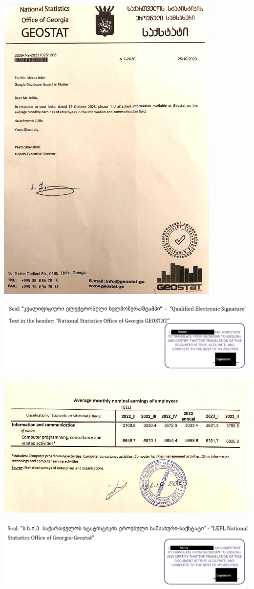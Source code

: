 
\begin{center}
    \includegraphics[width=30em]{salary-cover}
\end{center}
\WillContinue
\pagebreak

\Continuing
\includegraphics[width=\textwidth]{salary-cover_tr_public}

\includegraphics[width=\textwidth]{salary-data}

\includegraphics[width=\textwidth]{salary-data_tr_public}

\pagebreak
